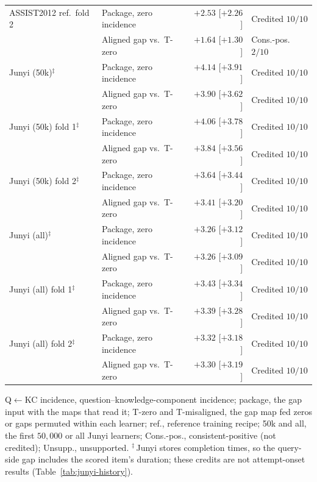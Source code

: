 \begin{table}[tbp]
\begin{tabular}{@{}llrl@{}}
\addlinespace[1pt]
ASSIST2012 ref.\ fold 2 & Package, zero incidence & $+2.53$ [$+2.26$] & Credited $10/10$ \\
 & Aligned gap vs.\ T-zero & $+1.64$ [$+1.30$] & Cons.-pos. $2/10$ \\
\addlinespace[1pt]
Junyi (50k)$^{\ddagger}$ & Package, zero incidence & $+4.14$ [$+3.91$] & Credited $10/10$ \\
 & Aligned gap vs.\ T-zero & $+3.90$ [$+3.62$] & Credited $10/10$ \\
\addlinespace[1pt]
Junyi (50k) fold 1$^{\ddagger}$ & Package, zero incidence & $+4.06$ [$+3.78$] & Credited $10/10$ \\
 & Aligned gap vs.\ T-zero & $+3.84$ [$+3.56$] & Credited $10/10$ \\
\addlinespace[1pt]
Junyi (50k) fold 2$^{\ddagger}$ & Package, zero incidence & $+3.64$ [$+3.44$] & Credited $10/10$ \\
 & Aligned gap vs.\ T-zero & $+3.41$ [$+3.20$] & Credited $10/10$ \\
\addlinespace[1pt]
Junyi (all)$^{\ddagger}$ & Package, zero incidence & $+3.26$ [$+3.12$] & Credited $10/10$ \\
 & Aligned gap vs.\ T-zero & $+3.26$ [$+3.09$] & Credited $10/10$ \\
\addlinespace[1pt]
Junyi (all) fold 1$^{\ddagger}$ & Package, zero incidence & $+3.43$ [$+3.34$] & Credited $10/10$ \\
 & Aligned gap vs.\ T-zero & $+3.39$ [$+3.28$] & Credited $10/10$ \\
\addlinespace[1pt]
Junyi (all) fold 2$^{\ddagger}$ & Package, zero incidence & $+3.32$ [$+3.18$] & Credited $10/10$ \\
 & Aligned gap vs.\ T-zero & $+3.30$ [$+3.19$] & Credited $10/10$ \\
\bottomrule
\end{tabular}

\smallskip
\parbox{0.92\linewidth}{\scriptsize
Q$\leftarrow$KC incidence, question--knowledge-component incidence;
package, the gap input with the maps that read it; T-zero and
T-misaligned, the gap map fed zeros or gaps permuted within each
learner; ref., reference training recipe; 50k and all, the first
$50{,}000$ or all Junyi learners; Cons.-pos., consistent-positive (not credited);
Unsupp., unsupported.
$^{\ddagger}$\,Junyi stores completion times, so the query-side gap
includes the scored item's duration; these credits are not
attempt-onset results (Table~\ref{tab:junyi-history}).
}
\end{table}

